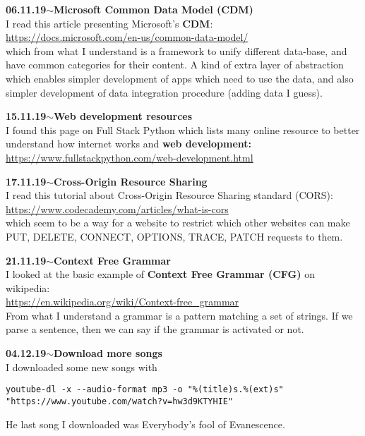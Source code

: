 \documentclass[11pt,a4paper]{article}
\newenvironment{loggentry}[2]%
{\noindent\textbf{#1}\hspace{1cm}$\mathbf{\sim}$\text{ }\textbf{#2}\\}{\vspace{0.5cm}}
\begin{document}
\begin{loggentry}{06.11.19}{Microsoft Common Data Model (CDM)}

I read this article presenting Microsoft's \textbf{CDM}:\\
\url{https://docs.microsoft.com/en-us/common-data-model/}\\
which from what I understand is a framework to unify different data-base, and have common categories for their content. A kind of extra layer of abstraction which enables simpler development of apps which need to use the data, and also simpler development of data integration procedure (adding data I guess).

\end{loggentry}


\begin{loggentry}{15.11.19}{Web development resources}

I found this page on Full Stack Python which lists many online resource to better understand how internet works and \textbf{web development:}\\
\url{https://www.fullstackpython.com/web-development.html}

\end{loggentry}


\begin{loggentry}{17.11.19}{Cross-Origin Resource Sharing}

I read this tutorial about Cross-Origin Resource Sharing standard (CORS):\\
\url{https://www.codecademy.com/articles/what-is-cors}\\
which seem to be a way for a website to restrict which other websites can make PUT, DELETE, CONNECT, OPTIONS, TRACE, PATCH requests to them.

\end{loggentry}


\begin{loggentry}{21.11.19}{Context Free Grammar}

I looked at the basic example of \textbf{Context Free Grammar (CFG)} on wikipedia:\\
\url{https://en.wikipedia.org/wiki/Context-free_grammar}\\
From what I understand a grammar is a pattern matching a set of strings. If we parse a sentence, then we can say if the grammar is activated or not.

\end{loggentry}


\begin{loggentry}{04.12.19}{Download more songs}

I downloaded some new songs with
\begin{verbatim}
youtube-dl -x --audio-format mp3 -o "%(title)s.%(ext)s" "https://www.youtube.com/watch?v=hw3d9KTYHIE"
\end{verbatim}

He last song I downloaded was Everybody's fool of Evanescence.\\

\end{loggentry}
\end{document}
